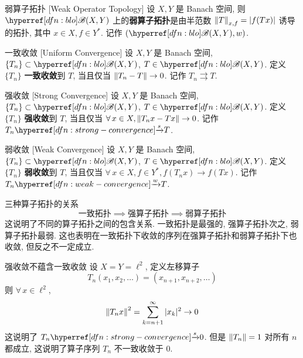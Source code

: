         \begin{dfn}
            {弱算子拓扑}
            [Weak Operator Topology]
            设 \(X,Y\) 是 Banach 空间, 则 \(\blo(X,Y)\) 上的\textbf{弱算子拓扑}是由半范数 \(\norm{T}_{x,f} = |f(Tx)|\) 诱导的拓扑, 其中 \(x\in X, f\in Y^*\). 记作 \((\blo(X,Y), w)\).
        \end{dfn}

        \begin{dfn}
            {一致收敛}
            [Uniform Convergence]
            设 \(X,Y\) 是 Banach 空间, \(\{T_n\}\subset \blo(X,Y)\), \(T\in \blo(X,Y)\). 定义 \(\{T_n\}\) \textbf{一致收敛}到 \(T\), 当且仅当 \(\norm{T_n-T} \to 0\). 记作 \(T_n\rightrightarrows T\).
        \end{dfn}

        \begin{dfn}
            {强收敛}
            [Strong Convergence]
            设 \(X,Y\) 是 Banach 空间, \(\{T_n\}\subset \blo(X,Y)\), \(T\in \blo(X,Y)\). 定义 \(\{T_n\}\) \textbf{强收敛}到 \(T\), 当且仅当 \(\forall\,x\in X, \norm{T_n x-Tx} \to 0\). 记作 \(T_n\slim T\).
        \end{dfn}

        \begin{dfn}
            {弱收敛}
            [Weak Convergence]
            设 \(X,Y\) 是 Banach 空间, \(\{T_n\}\subset \blo(X,Y)\), \(T\in \blo(X,Y)\). 定义 \(\{T_n\}\) \textbf{弱收敛}到 \(T\), 当且仅当 \(\forall\,x\in X, f\in Y^*, f(T_n x) \to f(Tx)\). 记作 \(T_n\wlim T\).
        \end{dfn}
        
        \begin{ppt}
            {三种算子拓扑的关系}
            \[\text{一致拓扑} \implies \text{强算子拓扑} \implies \text{弱算子拓扑}\]
            这说明了不同的算子拓扑之间的包含关系. 一致拓扑是最强的, 强算子拓扑次之, 弱算子拓扑最弱. 这也表明在一致拓扑下收敛的序列在强算子拓扑和弱算子拓扑下也收敛, 但反之不一定成立.
        \end{ppt}

        \begin{cxmp}
            {强收敛不蕴含一致收敛}
            设 \(X=Y=\ell^2\), 定义左移算子
            \[T_n(x_1,x_2,\dots) = (x_{n+1}, x_{n+2}, \dots)\]
            则 \(\forall\,x\in\ell^2\),
            \[\norm{T_n x}^2 = \sum_{k=n+1}^{\infty} |x_k|^2 \to 0\]
            这说明了 \(T_n\slim 0\). 但是 \(\norm{T_n} = 1\) 对所有 \(n\) 都成立, 这说明了算子序列 \(T_n\) 不一致收敛于 \(0\).
        \end{cxmp}

